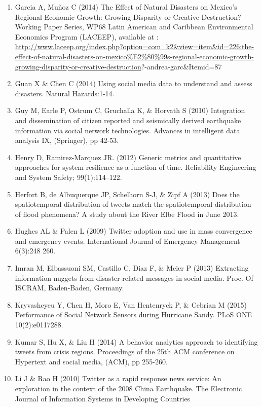 \documentclass[]{article}
\begin{document}
\begin{enumerate}
\item
  Garcia A, Muñoz C (2014) The Effect of Natural Disasters on Mexico's
  Regional Economic Growth: Growing Disparity or Creative Destruction?
  Working Paper Series, WP68 Latin American and Caribbean Environmental
  Economics Program (LACEEP), available at :
  \url{http://www.laceep.org/index.php?option=com_k2\&view=item\&id=226:the-effect-of-natural-disasters-on-mexico\%E2\%80\%99s-regional-economic-growth-growing-disparity-or-creative-destruction}?-andrea-garc\&Itemid=87
\item
  Guan X \& Chen C (2014) Using social media data to understand and
  assess disasters. Natural Hazards:1-14.
\item
  Guy M, Earle P, Ostrum C, Gruchalla K, \& Horvath S (2010) Integration
  and dissemination of citizen reported and seismically derived
  earthquake information via social network technologies. Advances in
  intelligent data analysis IX, (Springer), pp 42-53.
\item
  Henry D, Ramirez-Marquez JR. (2012) Generic metrics and quantitative
  approaches for system resilience as a function of time. Reliability
  Engineering and System Safety; 99(1):114--122.
\item
  Herfort B, de Albuquerque JP, Schelhorn S-J, \& Zipf A (2013) Does the
  spatiotemporal distribution of tweets match the spatiotemporal
  distribution of flood phenomena? A study about the River Elbe Flood in
  June 2013.
\item
  Hughes AL \& Palen L (2009) Twitter adoption and use in mass
  convergence and emergency events. International Journal of Emergency
  Management 6(3):248 260.
\item
  Imran M, Elbassuoni SM, Castillo C, Diaz F, \& Meier P (2013)
  Extracting information nuggets from disaster-related messages in
  social media. Proc. Of ISCRAM, Baden-Baden, Germany.
\item
  Kryvasheyeu Y, Chen H, Moro E, Van Hentenryck P, \& Cebrian M (2015)
  Performance of Social Network Sensors during Hurricane Sandy. PLoS ONE
  10(2):e0117288.
\item
  Kumar S, Hu X, \& Liu H (2014) A behavior analytics approach to
  identifying tweets from crisis regions. Proceedings of the 25th ACM
  conference on Hypertext and social media, (ACM), pp 255-260.
\item
  Li J \& Rao H (2010) Twitter as a rapid response news service: An
  exploration in the context of the 2008 China Earthquake. The
  Electronic Journal of Information Systems in Developing Countries

\end{enumerate}
\end{document}
